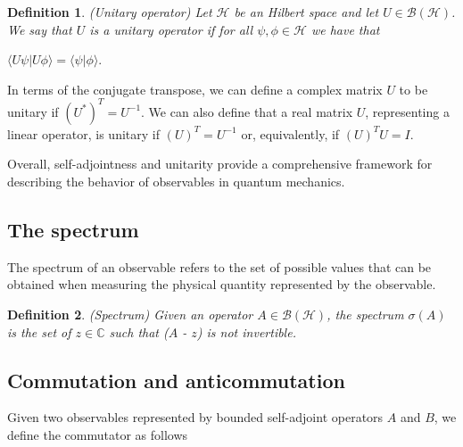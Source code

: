 \documentclass{Configuration_Files/PoliMi3i_thesis}
\newtheorem{definition}{Definition}[chapter]
\begin{document}
\begin{definition} (Unitary operator) Let $\mathscr{H}$ be an Hilbert space and let $U \in \mathscr{B}(\mathscr{H})$. We say that $U$ is a unitary operator if for all $\psi,\phi \in \mathscr{H}$ we have that
\end{definition}

\begin{center}
	$\langle U\psi|U\phi \rangle = \langle \psi|\phi \rangle$.
\end{center}

In terms of the conjugate transpose, we can define a complex matrix $U$ to be unitary if $ (U^*)^T=U^{-1}$. We can also define that a real matrix $U$, representing a linear operator, is unitary if $(U)^T = U^{-1}$ or, equivalently, if $(U)^T U=I$. 

Overall, self-adjointness and unitarity provide a comprehensive framework for describing the behavior of observables in quantum mechanics.


\subsection{The spectrum}

The spectrum of an observable refers to the set of possible values that can be obtained when measuring the physical quantity represented by the observable. 

\begin{definition}(Spectrum)
	Given an operator $A\in\mathscr{B(\mathscr{H})}$, the spectrum $\sigma(A)$ is the set of $z\in\mathbb{C}$ such that ($A$ - $z$) is not invertible.
\end{definition}



\subsection{Commutation and anticommutation}

Given two observables represented by bounded self-adjoint operators $A$ and $B$, we define the commutator as follows
\end{document}
